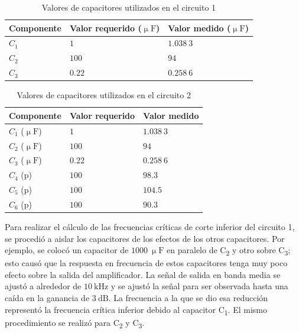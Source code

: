 \documentclass[journal]{IEEEtran}
\begin{document}
\begin{table}[H]
        \centering
        \renewcommand{\arraystretch}{1.5}
        \caption{Valores de capacitores utilizados en el circuito 1}
        \begin{tabular}{ >{\centering\arraybackslash}m{2.5cm} >{\centering\arraybackslash}m{2.5cm} >{\centering\arraybackslash}m{2.5cm} }
                \hline
            Componente & Valor requerido ($\upmu\mathrm{F}$) & Valor medido ($\upmu\mathrm{F}$)\\ 
            \hline
            \centering
            $C_1$ & $1$  & $1.038~3$  \\ 
            $C_2$ & $100$  & $94$ \\
            $C_3$ & $0.22$  & $0.258~6$ \\
            \hline
        \end{tabular}
        \label{tabla2}
    \end{table}    

\begin{table}[H]
        \centering
        \renewcommand{\arraystretch}{1.5}
        \caption{Valores de capacitores utilizados en el circuito 2}
        \begin{tabular}{ >{\centering\arraybackslash}m{2.5cm} >{\centering\arraybackslash}m{2.5cm} >{\centering\arraybackslash}m{2.5cm} }
                \hline
            Componente & Valor requerido & Valor medido\\ 
            \hline
            \centering
            $C_1$ ($\upmu\mathrm{F}$) & $1$  & $1.038~3$  \\ 
            $C_2$ ($\upmu\mathrm{F}$) & $100$  & $94$ \\
            $C_3$ ($\upmu\mathrm{F}$) & $0.22$  & $0.258~6$ \\
            $C_4$ ($\mathrm{p}$) & $100$ & $98.3$ \\
            $C_5$ ($\mathrm{p}$) & $100$ & $104.5$ \\
            $C_6$ ($\mathrm{p}$) & $100$ & $90.3$ \\
            \hline
        \end{tabular}
        \label{tabla3}
    \end{table}   

Para realizar el cálculo de las frecuencias críticas de corte inferior del circuito 1, se procedió a aislar los capacitores de los efectos de los otros capacitores. Por ejemplo, se colocó un capacitor de $1000~\upmu\mathrm{F}$ en paralelo de C\textsubscript{2} y otro sobre C\textsubscript{3}; esto causó que la respuesta en frecuencia de estos capacitores tenga muy poco efecto sobre la salida del amplificador.
La señal de salida en banda media se ajustó a alrededor de $10~\mathrm{kHz}$ y se ajustó la
señal para ser observada hasta una caída en la ganancia de $3~\mathrm{dB}$. La frecuencia a la que se dio esa reducción representó la frecuencia crítica inferior debido al capacitor C\textsubscript{1}. El mismo procedimiento
se realizó para C\textsubscript{2} y C\textsubscript{3}.
\end{document}
